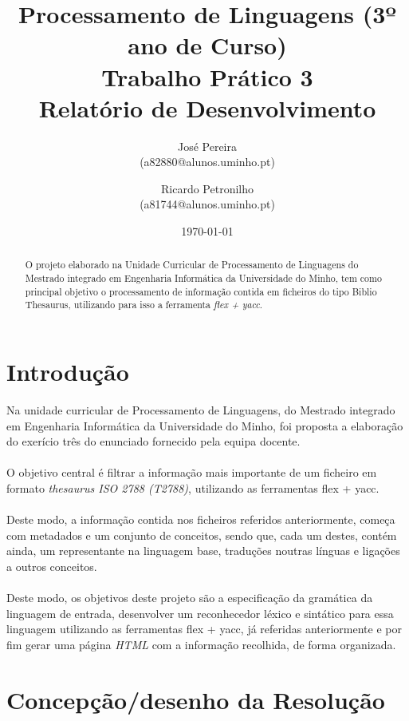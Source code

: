 \documentclass[11pt,a4paper]{report}%
\title{Processamento de Linguagens (3º ano de Curso)\\
       \textbf{Trabalho Prático 3}\\ Relatório de Desenvolvimento
       } %
\author{José Pereira\\ (a82880@alunos.uminho.pt) \and Ricardo Petronilho\\ (a81744@alunos.uminho.pt)
       } %
\date{\today} %
\begin{document}
\maketitle %

\begin{abstract}  %
O projeto elaborado na Unidade Curricular de Processamento de Linguagens do Mestrado integrado em Engenharia Informática da Universidade do Minho, tem como principal objetivo o processamento de informação contida em ficheiros do tipo Biblio Thesaurus, utilizando para isso a ferramenta \emph{flex + yacc}.
\end{abstract}

\tableofcontents %

\chapter{Introdução} \label{chap:intro} %

Na unidade curricular de Processamento de Linguagens, do Mestrado integrado em Engenharia Informática da Universidade do Minho, foi proposta a elaboração do exerício três do enunciado fornecido pela equipa docente. \\\\O objetivo central é filtrar a informação mais importante de um ficheiro em formato \emph{thesaurus ISO 2788 (T2788)}, utilizando as ferramentas flex + yacc.\\\\
Deste modo, a informação contida nos ficheiros referidos anteriormente, começa com metadados e um conjunto de conceitos, sendo que, cada um destes, contém ainda, um representante na linguagem base, traduções noutras línguas e ligações a outros conceitos.\\\\
Deste modo, os objetivos deste projeto são a especificação da gramática da linguagem de entrada,  desenvolver um reconhecedor léxico e sintático para essa linguagem utilizando as ferramentas flex + yacc, já referidas anteriormente e por fim gerar uma página \emph{HTML} com a informação recolhida, de forma organizada.

\chapter{Concepção/desenho da Resolução}
\end{document}
